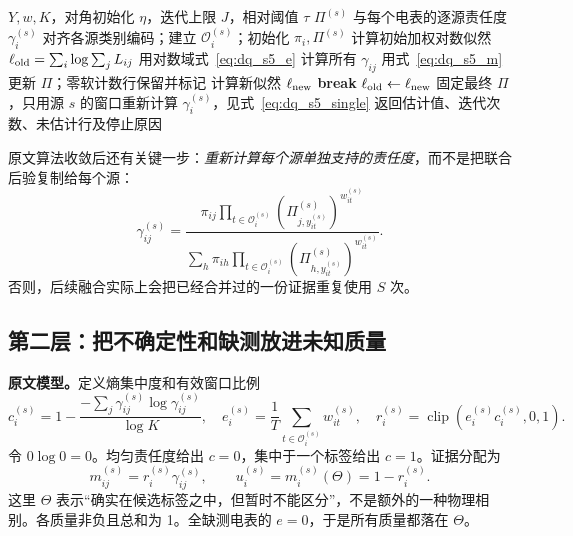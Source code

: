 \documentclass[UTF8,11pt,fontset=fandol,openany,oneside]{ctexbook}
\theoremstyle{definition}
\theoremstyle{remark}
\numberwithin{equation}{chapter}
\begin{document}
\begin{algorithm}[tbp]
\caption{S5 的 EM 主循环：原算法顺序，数值保护为教学补充}
\label{alg:dq_s5_em}
\begin{algorithmic}[1]
\Require $Y,w,K$，对角初始化 $\eta$，迭代上限 $J$，相对阈值 $\tau$
\Ensure $\Pi^{(s)}$ 与每个电表的逐源责任度 $\gamma_i^{(s)}$
\State 对齐各源类别编码；建立 $\mathcal O_i^{(s)}$；初始化 $\pi_i,\Pi^{(s)}$
\State 计算初始加权对数似然 $\ell_{\rm old}=\sum_i\log\sum_jL_{ij}$
  \State 用对数域式~\eqref{eq:dq_s5_e} 计算所有 $\gamma_{ij}$
  \State 用式~\eqref{eq:dq_s5_m} 更新 $\Pi$；零软计数行保留并标记
  \State 计算新似然 $\ell_{\rm new}$
    \State \textbf{break}
  \EndIf
  \State $\ell_{\rm old}\gets\ell_{\rm new}$
\EndFor
\State 固定最终 $\Pi$，只用源 $s$ 的窗口重新计算 $\gamma_i^{(s)}$，见式~\eqref{eq:dq_s5_single}
\State 返回估计值、迭代次数、未估计行及停止原因
\end{algorithmic}
\end{algorithm}

原文算法收敛后还有关键一步：\emph{重新计算每个源单独支持的责任度}，而不是把联合后验复制给每个源：
\begin{equation}
 \gamma_{ij}^{(s)}=
 \frac{\pi_{ij}\prod_{t\in\mathcal O_i^{(s)}}
 (\Pi_{j,y_{it}^{(s)}}^{(s)})^{w_{it}^{(s)}}}
 {\sum_h\pi_{ih}\prod_{t\in\mathcal O_i^{(s)}}
 (\Pi_{h,y_{it}^{(s)}}^{(s)})^{w_{it}^{(s)}}}.
 \label{eq:dq_s5_single}
\end{equation}
否则，后续融合实际上会把已经合并过的一份证据重复使用 $S$ 次。

\subsection{第二层：把不确定性和缺测放进未知质量}

\textbf{原文模型。}定义熵集中度和有效窗口比例
\begin{equation}
 c_i^{(s)}=1-\frac{-\sum_j\gamma_{ij}^{(s)}\log\gamma_{ij}^{(s)}}{\log K},
 \quad e_i^{(s)}=\frac1T\sum_{t\in\mathcal O_i^{(s)}}w_{it}^{(s)},
 \quad r_i^{(s)}=\operatorname{clip}(e_i^{(s)}c_i^{(s)},0,1).
 \label{eq:dq_s5_discount}
\end{equation}
令 $0\log0=0$。均匀责任度给出 $c=0$，集中于一个标签给出 $c=1$。证据分配为
\begin{equation}
 m_{ij}^{(s)}=r_i^{(s)}\gamma_{ij}^{(s)},\qquad
 u_i^{(s)}=m_i^{(s)}(\Theta)=1-r_i^{(s)}.
 \label{eq:dq_s5_bpa}
\end{equation}
这里 $\Theta$ 表示“确实在候选标签之中，但暂时不能区分”，不是额外的一种物理相别。各质量非负且总和为 1。全缺测电表的 $e=0$，于是所有质量都落在 $\Theta$。
\end{document}
